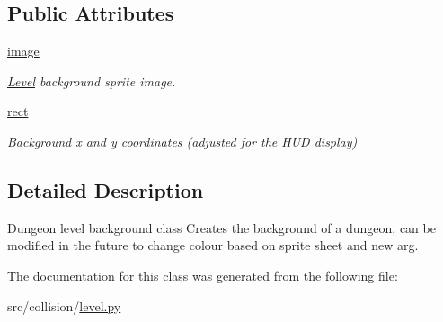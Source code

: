 \subsection*{Public Attributes}
\begin{DoxyCompactItemize}
\item 
\mbox{\label{classcollision_1_1level_1_1_level_a6be6fa8fdddb3acd8c632933afaa1bd4}} 
\hyperlink{classcollision_1_1level_1_1_level_a6be6fa8fdddb3acd8c632933afaa1bd4}{image}
\begin{DoxyCompactList}\small\item\em \hyperlink{classcollision_1_1level_1_1_level}{Level} background sprite image. \end{DoxyCompactList}\item 
\mbox{\label{classcollision_1_1level_1_1_level_a8f353b28bfe30c913bb5806d8eff5d54}} 
\hyperlink{classcollision_1_1level_1_1_level_a8f353b28bfe30c913bb5806d8eff5d54}{rect}
\begin{DoxyCompactList}\small\item\em Background x and y coordinates (adjusted for the H\+UD display) \end{DoxyCompactList}\end{DoxyCompactItemize}


\subsection{Detailed Description}
Dungeon level background class  Creates the background of a dungeon, can be modified in the future to change colour based on sprite sheet and new arg. 

The documentation for this class was generated from the following file\+:\begin{DoxyCompactItemize}
\item 
src/collision/\hyperlink{level_8py}{level.\+py}\end{DoxyCompactItemize}
